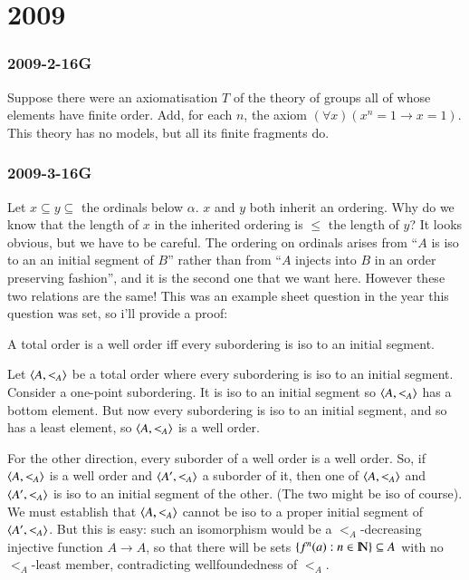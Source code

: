 \documentclass{book}
\begin{document}
\chapter{2009}
\subsection*{2009-2-16G}

Suppose there were an axiomatisation $T$ of the theory of groups all
of whose elements have finite order. Add, for each $n$, the axiom
$(\forall x)(x^n = 1 \to x = 1)$.  This theory has no models, but all
its finite fragments do.

\subsection*{2009-3-16G}\label{2009-3-16G}

Let $x \subseteq y \subseteq$ the ordinals below $\alpha$.  $x$ and
$y$ both inherit an ordering.  Why do we know that the length of $x$
in the inherited ordering is $\leq$ the length of $y$?  It looks
obvious, but we have to be careful.  The ordering on ordinals arises
from ``$A$ is iso to an an initial segment of $B$'' rather than from
``$A$ injects into $B$ in an order preserving fashion'', and it is the
second one that we want here.  However these two relations are the
same!  This was an example sheet question in the year this question
was set, so i'll provide a proof:

\begin{rem}
A total order is a well order iff every subordering is iso to an
initial segment.\end{rem}

\Proof Let $\mbox{$\langle A,<_A \rangle$}$ be a total order where every subordering 
is iso to an initial segment.  Consider a one-point subordering.  It 
is iso to an initial segment so $\mbox{$\langle A,<_A \rangle$}$ has a bottom element.  
But now every subordering is iso to an initial segment, and so has a 
least element, so $\mbox{$\langle A,<_A \rangle$}$ is a well order.

For the other direction, every suborder of a well order is a well order.
So, if $\mbox{$\langle A,<_A \rangle$}$ is a well order and $\mbox{$\langle A',<_A \rangle$}$ a suborder of
it, then one of $\mbox{$\langle A,<_A \rangle$}$ and $\mbox{$\langle A',<_A \rangle$}$ is iso to an initial
segment of the other.  (The two might be iso of course).  We must establish
that $\mbox{$\langle A,<_A \rangle$}$ cannot be iso to a proper initial
segment of $\mbox{$\langle A',<_A \rangle$}$.  But this is easy: such an isomorphism
would be a $<_A$-decreasing injective function $A \to A$, so that
there will be sets $\{f^n(a): n \in \hbox{\rm I\negthinspace N}\} \subseteq A$ with no
$<_A$-least member, contradicting wellfoundedness of $<_A$. \endproof
\label{original}
\end{document}
